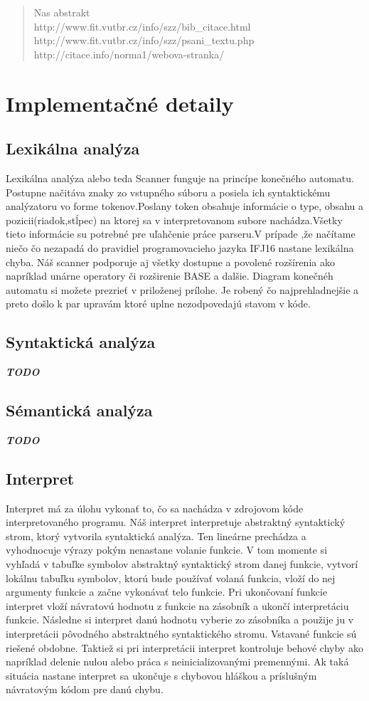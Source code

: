 \documentclass[12pt,a4paper]{report}
\begin{document}
\begin{abstract}
Nas abstrakt\\
http://www.fit.vutbr.cz/info/szz/bib\_citace.html\\
http://www.fit.vutbr.cz/info/szz/psani\_textu.php\\
http://citace.info/norma1/webova-stranka/
\end{abstract}

\tableofcontents

\chapter{Implementačné detaily}

\section{Lexikálna analýza}
Lexikálna analýza alebo teda Scanner funguje na princípe konečného automatu. Postupne načitáva  znaky zo vstupného súboru a posiela ich syntaktickému analýzatoru vo forme tokenov.Poslany token obsahuje informácie o type, obsahu a pozicii(riadok,stĺpec) na ktorej sa v interpretovanom subore nachádza.Všetky tieto informácie su potrebné pre uľahčenie práce parseru.V prípade ,že načítame niečo čo nezapadá do pravidiel programovacieho jazyka IFJ16 nastane lexikálna chyba. Náš scanner podporuje aj všetky dostupne a povolené rozšírenia ako napríklad unárne operatory či rozširenie BASE a dalšie. Diagram konečnéh automatu si možete prezrieť v priloženej prílohe. Je robený čo najprehladnejšie a preto došlo k par upravám ktoré uplne nezodpovedajú stavom v kóde.
\section{Syntaktická analýza}
\textbf{\textit{TODO}}
\section{Sémantická analýza}
\textbf{\textit{TODO}}
\section{Interpret}
Interpret má za úlohu vykonať to, čo sa nachádza v zdrojovom kóde interpretovaného programu. Náš interpret interpretuje abstraktný syntaktický strom, ktorý vytvorila syntaktická analýza. Ten lineárne prechádza a vyhodnocuje výrazy pokým nenastane volanie funkcie. V tom momente si vyhľadá v tabuľke symbolov abstraktný syntaktický strom danej funkcie, vytvorí lokálnu tabuľku symbolov, ktorú bude používať volaná funkcia, vloží do nej argumenty funkcie a začne vykonávať telo funkcie. Pri ukončovaní funkcie interpret vloží návratovú hodnotu z funkcie na zásobník a ukončí interpretáciu funkcie. Následne si interpret danú hodnotu vyberie zo zásobníka a použije ju v interpretácii pôvodného abstraktného syntaktického stromu. Vstavané funkcie sú riešené obdobne. Taktiež si pri interpretácii interpret kontroluje behové chyby ako napríklad delenie nulou alebo práca s neinicializovanými premennými. Ak taká situácia nastane interpret sa ukončuje s chybovou hláškou a príslušným návratovým kódom pre danú chybu.
\end{document}
